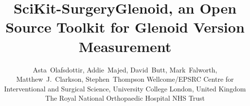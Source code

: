 \documentclass[a4paper, lmargin=1.925cm, rmargin=1.925cm,tmargin=2.54cm,bmargin=4.94cm]{spie}
\begin{document}
%
%
\pagestyle{plain}
%
%
\title{SciKit-SurgeryGlenoid, an Open Source Toolkit for Glenoid Version Measurement}
%
\author{Asta~Olafsdottir, Addie~Majed, David~Butt, Mark~Falworth,
Matthew~J.~Clarkson,
Stephen~Thompson
\skiplinehalf
{}Wellcome/EPSRC Centre for Interventional and Surgical Science, University College London, United Kingdom \\
The Royal National Orthopaedic Hospital NHS Trust\\
}

\maketitle              %

\begin{abstract}

\end{abstract}







%



\end{document}
